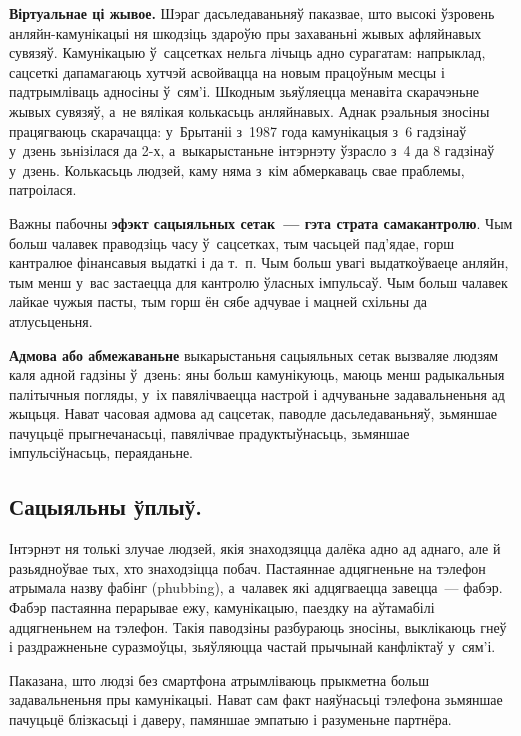 \textbf{Віртуальнае ці жывое.} Шэраг дасьледаваньняў паказвае, што высокі ўзровень анляйн-камунікацыі ня шкодзіць здароўю пры захаваньні жывых афляйнавых сувязяў. Камунікацыю ў~сацсетках нельга лічыць адно сурагатам: напрыклад, сацсеткі дапамагаюць хутчэй асвойвацца на новым працоўным месцы і падтрымліваць адносіны ў~сям'і. Шкодным зьяўляецца менавіта скарачэньне жывых сувязяў, а~не вялікая колькасьць анляйнавых. Аднак рэальныя зносіны працягваюць скарачацца: у~Брытаніі з~1987 года камунікацыя з~6 гадзінаў у~дзень зьнізілася да 2-х, а~выкарыстаньне інтэрнэту ўзрасло з~4 да 8 гадзінаў у~дзень. Колькасьць людзей, каму няма з~кім абмеркаваць свае праблемы, патроілася.

Важны пабочны \textbf{эфэкт сацыяльных сетак~--- гэта страта самакантролю}. Чым больш чалавек праводзіць часу ў~сацсетках, тым часьцей пад'ядае, горш кантралюе фінансавыя выдаткі і да т.~п. Чым больш увагі выдаткоўваеце анляйн, тым менш у~вас застаецца для кантролю ўласных імпульсаў. Чым больш чалавек лайкае чужыя пасты, тым горш ён сябе адчувае і мацней схільны да атлусьценьня.

\textbf{Адмова або абмежаваньне} выкарыстаньня сацыяльных сетак вызваляе людзям каля адной гадзіны ў~дзень: яны больш камунікуюць, маюць менш радыкальныя палітычныя погляды, у~іх павялічваецца настрой і адчуваньне задавальненьня ад жыцьця. Нават часовая адмова ад сацсетак, паводле дасьледаваньняў, зьмяншае пачуцьцё прыгнечанасьці, павялічвае прадуктыўнасьць, зьмяншае імпульсіўнасьць, пераяданьне.

\subsection*{Сацыяльны ўплыў.}

Інтэрнэт ня толькі злучае людзей, якія знаходзяцца далёка адно ад аднаго, але й разьядноўвае тых, хто знаходзіцца побач. Пастаяннае адцягненьне на тэлефон атрымала назву фабінг (phubbing), а~чалавек які адцягваецца завецца~--- фабэр. Фабэр пастаянна перарывае ежу, камунікацыю, паездку на аўтамабілі адцягненьнем на тэлефон. Такія паводзіны разбураюць зносіны, выклікаюць гнеў і раздражненьне суразмоўцы, зьяўляюцца частай прычынай канфліктаў у~сям'і.

Паказана, што людзі без смартфона атрымліваюць прыкметна больш задавальненьня пры камунікацыі. Нават сам факт наяўнасьці тэлефона зьмяншае пачуцьцё блізкасьці і даверу, памяншае эмпатыю і разуменьне партнёра.


